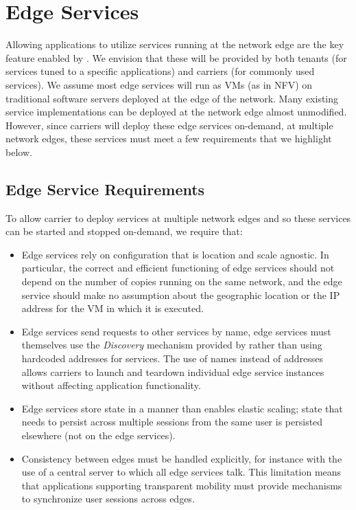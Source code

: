 \section{Edge Services}
\label{sec:edgeservices}
Allowing applications to utilize services running at the network edge are the key feature enabled by \name. We envision that these will be provided by both tenants (for services tuned to a specific applications) and carriers (for commonly used services). We assume most edge services will run as VMs (as in NFV) on traditional software servers deployed at the edge of the network. Many existing service implementations can be deployed at the network edge almost unmodified. However, since carriers will deploy these edge services on-demand, at multiple network edges, these services must meet a few requirements that we highlight below.

\subsection{Edge Service Requirements}
To allow carrier to deploy services at multiple network edges and so these services can be started and stopped on-demand, we require that:
\begin{itemize}
\item Edge services rely on configuration that is location and scale agnostic. In particular, the correct and efficient functioning of edge services should not depend on the number of copies running on the same network, and the edge service should make no assumption about the geographic location or the IP address for the VM in which it is executed. 
\item Edge services send requests to other services by name, \ie edge services must themselves use the \emph{Discovery} mechanism provided by \name rather than using hardcoded addresses for services. The use of names instead of addresses allows carriers to launch and teardown individual edge service instances without affecting application functionality.
\item Edge services store state in a manner than enables elastic scaling; \ie state that needs to persist across multiple sessions from the same user is persisted elsewhere (not on the edge services).
\item Consistency between edges must be handled explicitly, for instance with the use of a central server to which all edge services talk. This limitation means that applications supporting transparent mobility must provide mechanisms to synchronize user sessions across edges.
\end{itemize}

